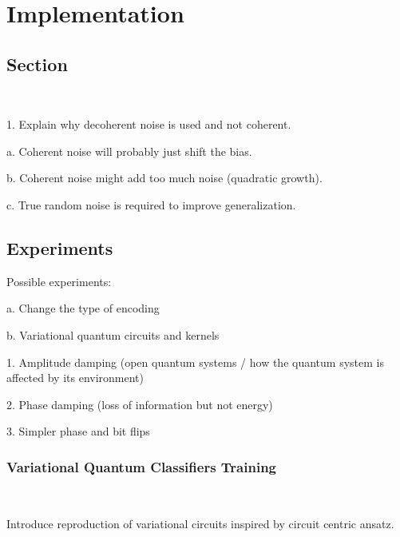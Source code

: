 \chapter{Implementation}\label{chapter:implementation}

\section{Section} \

1.	Explain why decoherent noise is used and not coherent. \

  a. Coherent noise will probably just shift the bias. \

  b. Coherent noise might add too much noise (quadratic growth). \

  c. True random noise is required to improve generalization. \


\section{Experiments}

Possible experiments: \

a. Change the type of encoding \

b. Variational quantum circuits and kernels \

 1. Amplitude damping (open quantum systems / how the quantum system is affected by its environment) \

 2. Phase damping (loss of information but not energy) \

 3. Simpler phase and bit flips \

 \subsection{Variational Quantum Classifiers Training}\label{subsection:vqc_training} \

 Introduce reproduction of variational circuits inspired by circuit centric ansatz. \

